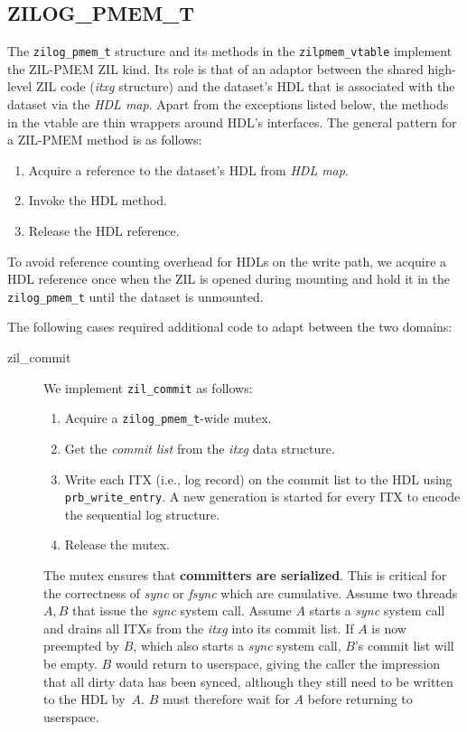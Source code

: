\documentclass[12pt,a4paper,twoside]{book}
\begin{document}
{\subsection{ZILOG\_PMEM\_T}\label{sec:zilpmem:zilog}
The \lstinline{zilog_pmem_t} structure and its methods in the \lstinline{zilpmem_vtable} implement the ZIL-PMEM ZIL kind.
Its role is that of an adaptor between the shared high-level ZIL code (\textit{itxg} structure) and the dataset's HDL that is associated with the dataset via the \textit{HDL map}.
Apart from the exceptions listed below, the methods in the vtable are thin wrappers around HDL's interfaces.
The general pattern for a ZIL-PMEM method is as follows:
\begin{enumerate}[noitemsep]
    \item Acquire a reference to the dataset's HDL from \textit{HDL map}.
    \item Invoke the HDL method.
    \item Release the HDL reference.
\end{enumerate}
To avoid reference counting overhead for HDLs on the write path, we acquire a HDL reference once when the ZIL is opened during mounting and hold it in the \lstinline{zilog_pmem_t} until the dataset is unmounted.

The following cases required additional code to adapt between the two domains:
\begin{description}
    \item[zil\_commit]
        We implement \lstinline{zil_commit} as follows:
        \begin{enumerate}[noitemsep]
            \item Acquire a \lstinline{zilog_pmem_t}-wide mutex.
            \item Get the \textit{commit list} from the \textit{itxg} data structure.
            \item Write each ITX (i.e., log record) on the commit list to the HDL using \lstinline{prb_write_entry}.
                A new generation is started for every ITX to encode the sequential log structure.
            \item Release the mutex.
        \end{enumerate}
        The mutex ensures that \textbf{committers are serialized}.
        This is critical for the correctness of \textit{sync} or \textit{fsync} which are cumulative.
        Assume two threads $A, B$ that issue the \textit{sync} system call.
        Assume $A$ starts a \textit{sync} system call and drains all ITXs from the \textit{itxg} into its commit list.
        If $A$ is now preempted by $B$, which also starts a \textit{sync} system call, $B$'s commit list will be empty.
        $B$ would return to userspace, giving the caller the impression that all dirty data has been synced, although they still need to be written to the HDL by~$A$.
        $B$ must therefore wait for $A$ before returning to userspace.


\end{description}}
\end{document}
